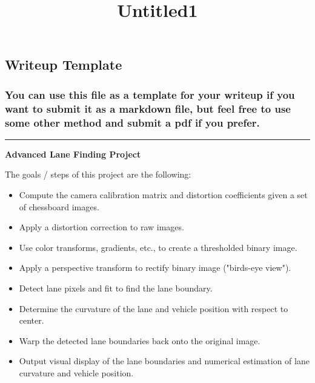 \documentclass[11pt]{article}
\title{Untitled1}
\providecommand{\tightlist}{%
      \setlength{\itemsep}{0pt}\setlength{\parskip}{0pt}}
\begin{document}
    
    
    \maketitle
    
    

    
    \subsection{Writeup Template}\label{writeup-template}

\subsubsection{You can use this file as a template for your writeup if
you want to submit it as a markdown file, but feel free to use some
other method and submit a pdf if you
prefer.}\label{you-can-use-this-file-as-a-template-for-your-writeup-if-you-want-to-submit-it-as-a-markdown-file-but-feel-free-to-use-some-other-method-and-submit-a-pdf-if-you-prefer.}

\begin{center}\rule{0.5\linewidth}{\linethickness}\end{center}

\textbf{Advanced Lane Finding Project}

The goals / steps of this project are the following:

\begin{itemize}
\tightlist
\item
  Compute the camera calibration matrix and distortion coefficients
  given a set of chessboard images.
\item
  Apply a distortion correction to raw images.
\item
  Use color transforms, gradients, etc., to create a thresholded binary
  image.
\item
  Apply a perspective transform to rectify binary image ("birds-eye
  view").
\item
  Detect lane pixels and fit to find the lane boundary.
\item
  Determine the curvature of the lane and vehicle position with respect
  to center.
\item
  Warp the detected lane boundaries back onto the original image.
\item
  Output visual display of the lane boundaries and numerical estimation
  of lane curvature and vehicle position.
\end{itemize}
\end{document}
